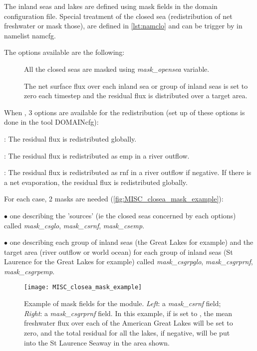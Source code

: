\documentclass[../main/NEMO_manual]{subfiles}
\begin{document}
The inland seas and lakes are defined using mask fields in the
domain configuration file. Special treatment of the closed sea (redistribution of net freshwater or mask those), are defined in \autoref{lst:namclo} and
can be trigger by  in namelist namcfg.

The options available are the following:
\begin{description}
\item[] All the closed seas are masked using \textit{mask\_opensea} variable.
\item[] The net surface flux over each inland sea or group of
inland seas is set to zero each timestep and the residual flux is
distributed over a target area.
\end{description}

When , 
3 options are available for the redistribution (set up of these options is done in the tool DOMAINcfg):
\begin{description}[font=$\bullet$ ]
\item[ glo]: The residual flux is redistributed globally.
\item[ emp]: The residual flux is redistributed as emp in a river outflow.
\item[ rnf]: The residual flux is redistributed as rnf in a river outflow if negative. If there is a net evaporation, the residual flux is redistributed globally.
\end{description}

For each case, 2 masks are needed (\autoref{fig:MISC_closea_mask_example}): 
\begin{description}
\item $\bullet$ one describing the 'sources' (ie the closed seas concerned by each options) called \textit{mask\_csglo}, \textit{mask\_csrnf}, \textit{mask\_csemp}. 
\item $\bullet$ one describing each group of inland seas (the Great Lakes for example) and the target area (river outflow or world ocean) for each group of inland seas (St Laurence for the Great Lakes for example) called
\textit{mask\_csgrpglo}, \textit{mask\_csgrprnf}, \textit{mask\_csgrpemp}.
\end{description}

\begin{figure}[!tbp]
  \centering
  \texttt{[image: MISC\_closea\_mask\_example]}
  \caption[Mask fields for the \protect{} module]{
    Example of mask fields for the \protect{} module.
    \textit{Left}: a \textit{mask\_csrnf} field;
    \textit{Right}: a \textit{mask\_csgrprnf} field.
    In this example, if \protect{} is set to ,
    the mean freshwater flux over each of the American Great Lakes will be set to zero,
    and the total residual for all the lakes, if negative, will be put into
    the St Laurence Seaway in the area shown.}
  \label{fig:MISC_closea_mask_example}
\end{figure}
\end{document}
